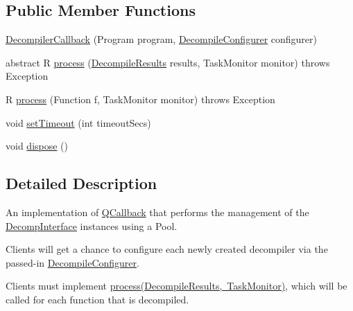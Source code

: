 \subsection*{Public Member Functions}
\begin{DoxyCompactItemize}
\item 
\mbox{\hyperlink{classghidra_1_1app_1_1decompiler_1_1parallel_1_1_decompiler_callback_a7c926a046a5dc4e8021b5120be9391a8}{Decompiler\+Callback}} (Program program, \mbox{\hyperlink{interfaceghidra_1_1app_1_1decompiler_1_1parallel_1_1_decompile_configurer}{Decompile\+Configurer}} configurer)
\item 
abstract R \mbox{\hyperlink{classghidra_1_1app_1_1decompiler_1_1parallel_1_1_decompiler_callback_a88619cf2cd572fb627bf4ff62430ec2f}{process}} (\mbox{\hyperlink{classghidra_1_1app_1_1decompiler_1_1_decompile_results}{Decompile\+Results}} results, Task\+Monitor monitor)  throws Exception
\item 
R \mbox{\hyperlink{classghidra_1_1app_1_1decompiler_1_1parallel_1_1_decompiler_callback_ae6c111f0e5eb83fadce287f6203868d6}{process}} (Function f, Task\+Monitor monitor)  throws Exception 
\item 
void \mbox{\hyperlink{classghidra_1_1app_1_1decompiler_1_1parallel_1_1_decompiler_callback_adec6e5b5a210ecaf2bcb28e1c42415f1}{set\+Timeout}} (int timeout\+Secs)
\item 
void \mbox{\hyperlink{classghidra_1_1app_1_1decompiler_1_1parallel_1_1_decompiler_callback_a652c2f3d7b74015ec26bedb980920049}{dispose}} ()
\end{DoxyCompactItemize}


\subsection{Detailed Description}
An implementation of \mbox{\hyperlink{}{Q\+Callback}} that performs the management of the \mbox{\hyperlink{classghidra_1_1app_1_1decompiler_1_1_decomp_interface}{Decomp\+Interface}} instances using a Pool.

Clients will get a chance to configure each newly created decompiler via the passed-\/in \mbox{\hyperlink{interfaceghidra_1_1app_1_1decompiler_1_1parallel_1_1_decompile_configurer}{Decompile\+Configurer}}.

Clients must implement \mbox{\hyperlink{classghidra_1_1app_1_1decompiler_1_1parallel_1_1_decompiler_callback_a88619cf2cd572fb627bf4ff62430ec2f}{process(\+Decompile\+Results, Task\+Monitor)}}, which will be called for each function that is decompiled.


